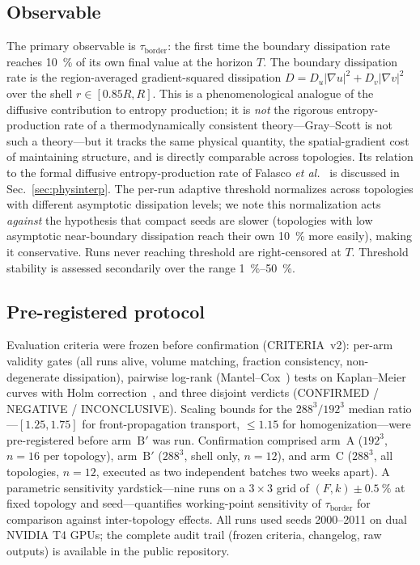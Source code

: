\documentclass[aps,pre,preprint,superscriptaddress,nofootinbib,floatfix]{revtex4-2}
\newcommand{\tb}{\tau_{\mathrm{border}}}
\begin{document}
\subsection{Observable}

The primary observable is $\tb$: the first time the boundary dissipation rate reaches \SI{10}{\percent} of its own final value at the horizon $T$. The boundary dissipation rate is the region-averaged gradient-squared dissipation $D = D_u|\nabla u|^2 + D_v|\nabla v|^2$ over the shell $r\in[0.85R,R]$. This is a phenomenological analogue of the diffusive contribution to entropy production; it is \textit{not} the rigorous entropy-production rate of a thermodynamically consistent theory---Gray--Scott is not such a theory---but it tracks the same physical quantity, the spatial-gradient cost of maintaining structure, and is directly comparable across topologies. Its relation to the formal diffusive entropy-production rate of Falasco \textit{et al.}~\cite{falasco2018} is discussed in Sec.~\ref{sec:physinterp}. The per-run adaptive threshold normalizes across topologies with different asymptotic dissipation levels; we note this normalization acts \textit{against} the hypothesis that compact seeds are slower (topologies with low asymptotic near-boundary dissipation reach their own \SI{10}{\percent} more easily), making it conservative. Runs never reaching threshold are right-censored at $T$. Threshold stability is assessed secondarily over the range \SIrange{1}{50}{\percent}.

\subsection{Pre-registered protocol}
\label{sec:protocol}

Evaluation criteria were frozen before confirmation (CRITERIA~v2): per-arm validity gates (all runs alive, volume matching, fraction consistency, non-degenerate dissipation), pairwise log-rank (Mantel--Cox~\cite{mantel1966}) tests on Kaplan--Meier~\cite{kaplan1958} curves with Holm correction~\cite{holm1979}, and three disjoint verdicts (CONFIRMED / NEGATIVE / INCONCLUSIVE). Scaling bounds for the $288^3/192^3$ median ratio---$[1.25,1.75]$ for front-propagation transport, ${\le}1.15$ for homogenization---were pre-registered before arm~$\mathrm{B}'$ was run. Confirmation comprised arm~A ($192^3$, $n=16$ per topology), arm~$\mathrm{B}'$ ($288^3$, shell only, $n=12$), and arm~C ($288^3$, all topologies, $n=12$, executed as two independent batches two weeks apart). A parametric sensitivity yardstick---nine runs on a $3\times3$ grid of $(F,k)\pm\SI{0.5}{\percent}$ at fixed topology and seed---quantifies working-point sensitivity of $\tb$ for comparison against inter-topology effects. All runs used seeds 2000--2011 on dual NVIDIA T4 GPUs; the complete audit trail (frozen criteria, changelog, raw outputs) is available in the public repository.
\end{document}
